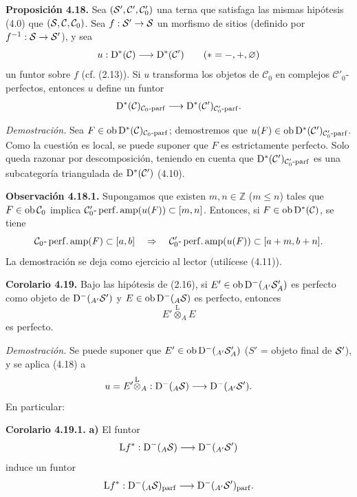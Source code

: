 \textbf{Proposición 4.18.} Sea \((\sisi{S'}{\mathcal S'},\mathcal C',\mathcal C'_0)\) una terna que satisfaga las mismas hipótesis (4.0) que \((\sisi{S}{\mathcal S},\mathcal C,\mathcal C_0)\). Sea \(f:\sisi{S'}{\mathcal S'}\to \sisi{S}{\mathcal S}\) un morfismo de sitios (definido por \(f^{-1}:\sisi{S}{\mathcal S}\to \sisi{S'}{\mathcal S'}\)), y sea
\[
  u:\Dpx^*(\mathcal C)\longrightarrow \Dpx^*(\mathcal C')\qquad (*=-,+,\varnothing)
\]
un funtor sobre \(f\) (cf. (2.13)). Si \(u\) transforma los objetos de \(\mathcal C_0\) en complejos \(\mathcal C'_0\)-perfectos, entonces \(u\) define un funtor
\[
  \Dpx^*(\mathcal C)_{\mathcal C_0\text{-}\mathrm{parf}}
  \longrightarrow
  \Dpx^*(\mathcal C')_{\mathcal C'_0\text{-}\mathrm{parf}}.
\]

\emph{Demostración.} Sea \(F\in\Ob\Dpx^*(\mathcal C)_{\mathcal C_0\text{-}\mathrm{parf}}\); demostremos que \(u(F)\in\Ob\Dpx^*(\mathcal C')_{\mathcal C'_0\text{-}\mathrm{parf}}\). Como la cuestión es local, se puede suponer que \(F\) es estrictamente perfecto. Solo queda razonar por descomposición, teniendo en cuenta que \(\Dpx^*(\mathcal C')_{\mathcal C'_0\text{-}\mathrm{parf}}\) es una subcategoría triangulada de \(\sisi{\Dpx^*(\mathcal C)}{\Dpx^*(\mathcal C')}\) (4.10).

\textbf{Observación 4.18.1.} Supongamos que existen \(m,n\in\mathbb Z\) (\(m\leq n\)) tales que \(F\in\Ob\mathcal C_0\) implica \(\mathcal C'_0\text{-}\perfamp(u(F))\subset[m,n]\). Entonces, si \(F\in\Ob\Dpx^*(\mathcal C)\), se tiene
\[
  \mathcal C_0\text{-}\perfamp(F)
  \subset[a,b]
  \quad\Rightarrow\quad
  \mathcal C'_0\text{-}\perfamp(u(F))
  \subset[a+m,b+n].
\]
La demostración se deja como ejercicio al lector (utilícese (4.11)).

\textbf{Corolario 4.19.} Bajo las hipótesis de (2.16), si \(E'\in\Ob\sisi{\Dpx^-({}_A, S'_A)}{\Dpx^-({}_{A'}\mathcal S'_A)}\) es perfecto como objeto de \(\sisi{\Dpx^-({}_A, S')}{\Dpx^-({}_{A'}\mathcal S')}\) y \(E\in\Ob\sisi{\Dpx^-({}_A S)}{\Dpx^-({}_A\mathcal S)}\) es perfecto, entonces
\[
  E'\overset{\mathrm L}{\otimes}_A E
\]
es perfecto.

\emph{Demostración.} Se puede suponer que \(E'\in\Ob\sisi{\Dpx^-({}_A, S'_A)}{\Dpx^-({}_{A'}\mathcal S'_A)}\) (\(S'\) = objeto final de \(\sisi{S'}{\mathcal S'}\)), y se aplica (4.18) a
\[
  u=E'\overset{\mathrm L}{\otimes}_A:
  \sisi{\Dpx^-({}_A S)}{\Dpx^-({}_A\mathcal S)}\longrightarrow \sisi{\Dpx^-({}_A, S')}{\Dpx^-({}_{A'}\mathcal S')}.
\]
En particular:

\textbf{Corolario 4.19.1.} \textbf{a)} El funtor
\[
  \mathrm L f^*:\sisi{\Dpx^-({}_A S)}{\Dpx^-({}_A\mathcal S)}\longrightarrow \sisi{\Dpx^-({}_A, S')}{\Dpx^-({}_{A'}\mathcal S')}
\]
induce un funtor
\[
  \mathrm L f^*:\sisi{\Dpx^-({}_A S)_{\mathrm{parf}}}{\Dpx^-({}_A\mathcal S)_{\mathrm{parf}}}
  \longrightarrow
  \sisi{\Dpx^-({}_A, S')_{\mathrm{parf}}}{\Dpx^-({}_{A'}\mathcal S')_{\mathrm{parf}}}.
\]

